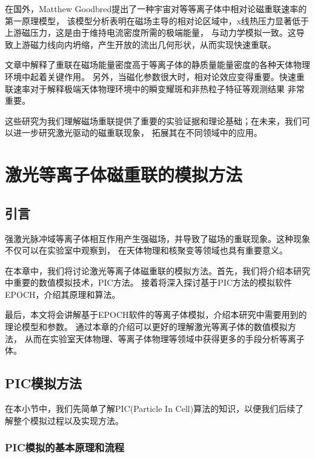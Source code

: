 在国外，Matthew Goodbred\cite{PhysRevLett.129.265101}提出了一种宇宙对等等离子体中相对论磁重联速率的第一原理模型，
该模型分析表明在磁场主导的相对论区域中，x线热压力显著低于上游磁压力，这是由于维持电流密度所需的极端能量，
与动力学模拟一致。这导致上游磁力线向内坍缩，产生开放的流出几何形状，从而实现快速重联。

文章中解释了重联在磁场能量密度高于等离子体的静质量能量密度的各种天体物理环境中起着关键作用。
另外，当磁化参数很大时，相对论效应变得重要。快速重联速率对于解释极端天体物理环境中的瞬变耀斑和非热粒子特征等观测结果
非常重要\cite{RevModPhys.82.603}。

这些研究为我们理解磁场重联提供了重要的实验证据和理论基础；在未来，我们可以进一步研究激光驱动的磁重联现象，
拓展其在不同领域中的应用。

\chapter{\textbf{激光等离子体磁重联的模拟方法}}%
\section[\textnormal{引言}]{\textbf{引言}}

强激光脉冲域等离子体相互作用产生强磁场，并导致了磁场的重联现象。这种现象不仅可以在实验室中观察到，
在天体物理和核聚变等领域也具有重要意义。

在本章中，我们将讨论激光等离子体磁重联的模拟方法。首先，我们将介绍本研究中重要的数值模拟技术，PIC方法。
接着将深入探讨基于PIC方法的模拟软件EPOCH\cite{Arber:2015hc}，介绍其原理和算法。

最后，本文将会讲解基于EPOCH软件的等离子体模拟，介绍本研究中需要用到的理论模型和参数。
通过本章的介绍可以更好的理解激光等离子体的数值模拟方法，
从而在实验室天体物理、等离子体物理等领域中获得更多的手段分析等离子体。

\section[\textnormal{PIC模拟方法}]{\textbf{PIC模拟方法}}

在本小节中，我们先简单了解PIC(Particle In Cell)算法的知识，以便我们后续了解整个模拟过程以及实现方法。

\subsection[\textnormal{PIC模拟的基本原理和流程}]{\textbf{PIC模拟的基本原理和流程}}

